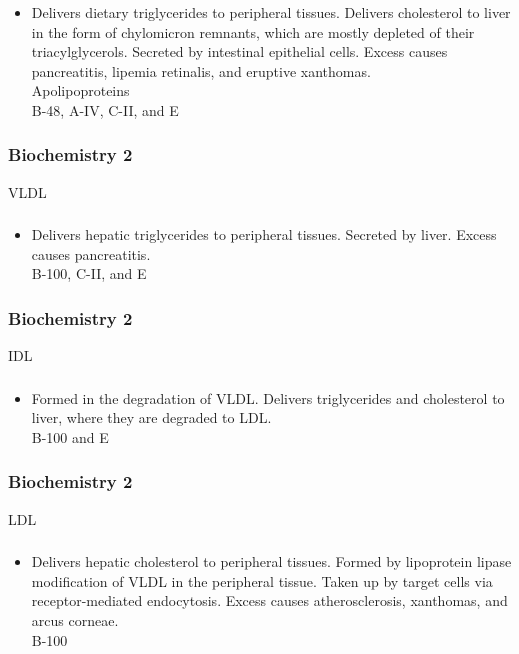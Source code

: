 \documentclass[11pt]{beamer}
\begin{document}
\begin{frame}
 \frametitle{}
\begin{itemize}
\item Delivers dietary triglycerides to peripheral tissues. Delivers cholesterol to liver in the form of chylomicron remnants, which are mostly depleted of their triacylglycerols. Secreted by intestinal epithelial cells. Excess causes pancreatitis, lipemia retinalis, and eruptive xanthomas. \\ Apolipoproteins \\ B-48, A-IV, C-II, and E
\end{itemize}
\end{frame}

\begin{frame}
 \frametitle{Biochemistry 2}
VLDL
\end{frame}

\begin{frame}
 \frametitle{}
\begin{itemize}
\item Delivers hepatic triglycerides to peripheral tissues. Secreted by liver. Excess causes pancreatitis. \\ B-100, C-II, and E
\end{itemize}
\end{frame}

\begin{frame}
 \frametitle{Biochemistry 2}
IDL
\end{frame}

\begin{frame}
 \frametitle{}
\begin{itemize}
\item Formed in the degradation of VLDL. Delivers triglycerides and cholesterol to liver, where they are degraded to LDL. \\ B-100 and E
\end{itemize}
\end{frame}

\begin{frame}
 \frametitle{Biochemistry 2}
LDL
\end{frame}

\begin{frame}
 \frametitle{}
\begin{itemize}
\item Delivers hepatic cholesterol to peripheral tissues. Formed by lipoprotein lipase modification of VLDL in the peripheral tissue. Taken up by target cells via receptor-mediated endocytosis. Excess causes atherosclerosis, xanthomas, and arcus corneae. \\ B-100
\end{itemize}
\end{frame}
\end{document}
